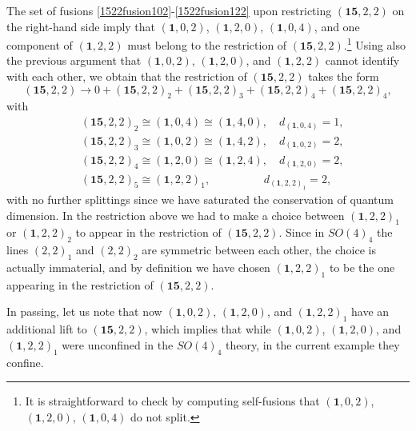\documentclass[11pt]{article}
\numberwithin{equation}{section}
\begin{document}
The set of fusions \eqref{1522fusion102}-\eqref{1522fusion122} upon restricting $(\mathbf{15},2,2)$ on the right-hand side imply that $(\mathbf{1},0,2)$, $(\mathbf{1},2,0)$, $(\mathbf{1},0,4)$, and one component of $(\mathbf{1},2,2)$ must belong to the restriction of $(\mathbf{15},2,2)$.\footnote{It is straightforward to check by computing self-fusions that $(\mathbf{1},0,2)$, $(\mathbf{1},2,0)$, $(\mathbf{1},0,4)$ do not split.} Using also the previous argument that $(\mathbf{1},0,2)$, $(\mathbf{1},2,0)$, and  $(\mathbf{1},2,2)$ cannot identify with each other, we obtain that the restriction of $(\mathbf{15},2,2)$ takes the form
\begin{equation} \label{1522restriction}
    (\mathbf{15},2,2) \longrightarrow 0 + (\mathbf{15},2,2)_{2} + (\mathbf{15},2,2)_{3} + (\mathbf{15},2,2)_{4} + (\mathbf{15},2,2)_{4},
\end{equation}
with
\begin{align}
    &(\mathbf{15},2,2)_{2} \cong (\mathbf{1},0,4) \cong (\mathbf{1},4,0), \quad d_{(\mathbf{1},0,4)} = 1, \\[0.3cm] &(\mathbf{15},2,2)_{3} \cong (\mathbf{1},0,2) \cong (\mathbf{1},4,2), \quad d_{(\mathbf{1},0,2)} = 2, \\[0.3cm] &(\mathbf{15},2,2)_{4} \cong (\mathbf{1},2,0) \cong (\mathbf{1},2,4), \quad d_{(\mathbf{1},2,0)} = 2, \\[0.3cm] &(\mathbf{15},2,2)_{5} \cong (\mathbf{1},2,2)_{1}, \hspace{2cm} d_{(\mathbf{1},2,2)_{1}} = 2,
\end{align}
with no further splittings since we have saturated the conservation of quantum dimension. In the restriction above we had to make a choice between $(\mathbf{1},2,2)_{1}$ or $(\mathbf{1},2,2)_{2}$ to appear in the restriction of $(\mathbf{15},2,2)$. Since in $SO(4)_{4}$ the lines $(2,2)_{1}$ and $(2,2)_{2}$ are symmetric between each other, the choice is actually immaterial, and by definition we have chosen $(\mathbf{1},2,2)_{1}$ to be the one appearing in the restriction of $(\mathbf{15},2,2)$.

In passing, let us note that now $(\mathbf{1},0,2)$, $(\mathbf{1},2,0)$, and $(\mathbf{1},2,2)_{1}$ have an additional lift to $(\mathbf{15},2,2)$, which implies that while $(\mathbf{1},0,2)$, $(\mathbf{1},2,0)$, and $(\mathbf{1},2,2)_{1}$ were unconfined in the $SO(4)_{4}$ theory, in the current example they confine. 
\end{document}
